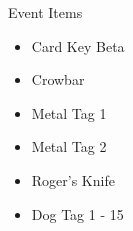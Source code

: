 \begin{eventitems}{Event Items}
    \begin{itemize}
        \item Card Key Beta
        \item Crowbar
        \item Metal Tag 1
        \item Metal Tag 2
        \item Roger's Knife
        \item Dog Tag 1 - 15
    \end{itemize}
\end{eventitems}
